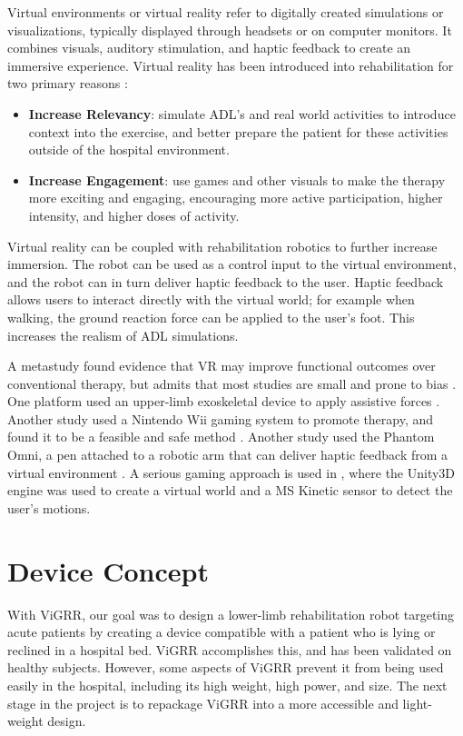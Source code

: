 \documentclass[12pt]{report}
\begin{document}
	Virtual environments or virtual reality refer to digitally created simulations or visualizations, typically displayed through headsets or on computer monitors. It combines visuals, auditory stimulation, and haptic feedback to create an immersive experience. Virtual reality has been introduced into rehabilitation for two primary reasons \cite{Laver2015}:
	\begin{itemize}
		\item \textbf{Increase Relevancy}: simulate ADL's and real world activities to introduce context into the exercise, and better prepare the patient for these activities outside of the hospital environment. 
		\item \textbf{Increase Engagement}: use games and other visuals to make the therapy more exciting and engaging, encouraging more active participation, higher intensity, and higher doses of activity. 
	\end{itemize}

	Virtual reality can be coupled with rehabilitation robotics to further increase immersion. The robot can be used as a control input to the virtual environment, and the robot can in turn deliver haptic feedback to the user. Haptic feedback allows users to interact directly with the virtual world; for example when walking, the ground reaction force can be applied to the user's foot. This increases the realism of ADL simulations. 
	
	A metastudy found evidence that VR may improve functional outcomes over conventional therapy, but admits that most studies are small and prone to bias \cite{Laver2015}. One platform used an upper-limb exoskeletal device to apply assistive forces  \cite{Patel2015}. Another study used a Nintendo Wii gaming system to promote therapy, and found it to be a feasible and safe method  \cite{Saposnik2010}. Another study used the Phantom Omni, a pen attached to a robotic arm that can deliver haptic feedback from a virtual environment \cite{Jiang2017}. A serious gaming approach is used in \cite{SociedadeBrasileiradeInformaticaemSaude2014}, where the Unity3D engine was used to create a virtual world and a MS Kinetic sensor to detect the user's motions. 
	


	
\section{Device Concept} 

With ViGRR, our goal was to design a lower-limb rehabilitation robot targeting acute patients by creating a device compatible with a patient who is lying or reclined in a hospital bed. ViGRR accomplishes this, and has been validated on healthy subjects. However, some aspects of ViGRR prevent it from being used easily in the hospital, including its high weight, high power, and size. The next stage in the project is to repackage ViGRR into a more accessible and light-weight design. 
\end{document}
